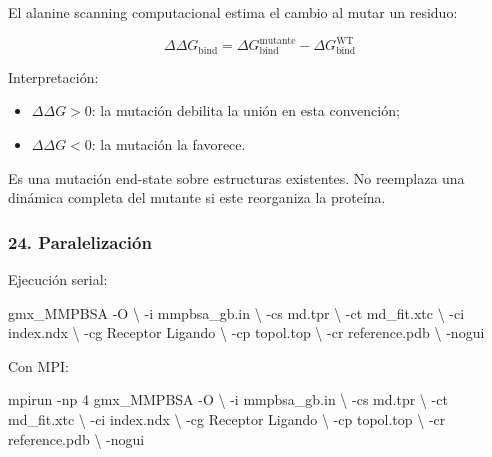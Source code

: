 \documentclass[
  spanish,
  11pt,
  a4paper]{article}
\newenvironment{Shaded}{\begin{snugshade}}{\end{snugshade}}
\newcommand{\AttributeTok}[1]{\textcolor[rgb]{0.13,0.29,0.53}{#1}}
\newcommand{\DataTypeTok}[1]{\textcolor[rgb]{0.13,0.29,0.53}{#1}}
\newcommand{\ExtensionTok}[1]{#1}
\newcommand{\NormalTok}[1]{#1}
\providecommand{\tightlist}{%
  \setlength{\itemsep}{0pt}\setlength{\parskip}{0pt}}
\begin{document}
El alanine scanning computacional estima el cambio al mutar un residuo:

\[
\Delta\Delta G_{\mathrm{bind}}
=
\Delta G_{\mathrm{bind}}^{\mathrm{mutante}}
-
\Delta G_{\mathrm{bind}}^{\mathrm{WT}}
\]

Interpretación:

\begin{itemize}
\tightlist
\item
  \(\Delta\Delta G>0\): la mutación debilita la unión en esta
  convención;
\item
  \(\Delta\Delta G<0\): la mutación la favorece.
\end{itemize}

Es una mutación end-state sobre estructuras existentes. No reemplaza una
dinámica completa del mutante si este reorganiza la proteína.

\subsubsection{24. Paralelización}\label{paralelizaciuxf3n}

Ejecución serial:

\begin{Shaded}
\begin{Highlighting}[]
\ExtensionTok{gmx\_MMPBSA} \AttributeTok{{-}O} \DataTypeTok{\textbackslash{}}
    \AttributeTok{{-}i}\NormalTok{ mmpbsa\_gb.in }\DataTypeTok{\textbackslash{}}
    \AttributeTok{{-}cs}\NormalTok{ md.tpr }\DataTypeTok{\textbackslash{}}
    \AttributeTok{{-}ct}\NormalTok{ md\_fit.xtc }\DataTypeTok{\textbackslash{}}
    \AttributeTok{{-}ci}\NormalTok{ index.ndx }\DataTypeTok{\textbackslash{}}
    \AttributeTok{{-}cg}\NormalTok{ Receptor Ligando }\DataTypeTok{\textbackslash{}}
    \AttributeTok{{-}cp}\NormalTok{ topol.top }\DataTypeTok{\textbackslash{}}
    \AttributeTok{{-}cr}\NormalTok{ reference.pdb }\DataTypeTok{\textbackslash{}}
    \AttributeTok{{-}nogui}
\end{Highlighting}
\end{Shaded}

Con MPI:

\begin{Shaded}
\begin{Highlighting}[]
\ExtensionTok{mpirun} \AttributeTok{{-}np}\NormalTok{ 4 gmx\_MMPBSA }\AttributeTok{{-}O} \DataTypeTok{\textbackslash{}}
    \AttributeTok{{-}i}\NormalTok{ mmpbsa\_gb.in }\DataTypeTok{\textbackslash{}}
    \AttributeTok{{-}cs}\NormalTok{ md.tpr }\DataTypeTok{\textbackslash{}}
    \AttributeTok{{-}ct}\NormalTok{ md\_fit.xtc }\DataTypeTok{\textbackslash{}}
    \AttributeTok{{-}ci}\NormalTok{ index.ndx }\DataTypeTok{\textbackslash{}}
    \AttributeTok{{-}cg}\NormalTok{ Receptor Ligando }\DataTypeTok{\textbackslash{}}
    \AttributeTok{{-}cp}\NormalTok{ topol.top }\DataTypeTok{\textbackslash{}}
    \AttributeTok{{-}cr}\NormalTok{ reference.pdb }\DataTypeTok{\textbackslash{}}
    \AttributeTok{{-}nogui}
\end{Highlighting}
\end{Shaded}
\end{document}
